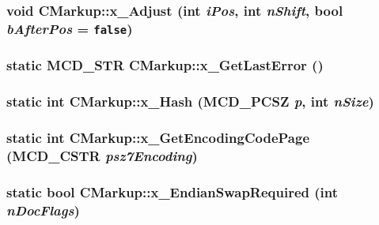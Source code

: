 \subsubsection[x\_\-Adjust]{\setlength{\rightskip}{0pt plus 5cm}void CMarkup::x\_\-Adjust (int {\em iPos}, \/  int {\em nShift}, \/  bool {\em bAfterPos} = {\tt false})\hspace{0.3cm}{\tt  [protected]}}\label{classCMarkup_b9d78278bfb6a7d3799e0289744da98d}


\subsubsection[x\_\-GetLastError]{\setlength{\rightskip}{0pt plus 5cm}static MCD\_\-STR CMarkup::x\_\-GetLastError ()\hspace{0.3cm}{\tt  [static, protected]}}\label{classCMarkup_7a902073dcce3edc449753cb5e8bac4c}


\subsubsection[x\_\-Hash]{\setlength{\rightskip}{0pt plus 5cm}static int CMarkup::x\_\-Hash (MCD\_\-PCSZ {\em p}, \/  int {\em nSize})\hspace{0.3cm}{\tt  [inline, static, protected]}}\label{classCMarkup_e0869e4876675e0272ab21aa4d5c1058}


\subsubsection[x\_\-GetEncodingCodePage]{\setlength{\rightskip}{0pt plus 5cm}static int CMarkup::x\_\-GetEncodingCodePage ({\bf MCD\_\-CSTR} {\em psz7Encoding})\hspace{0.3cm}{\tt  [static, protected]}}\label{classCMarkup_de551e17e600f8e6ec17bf7a46325285}


\subsubsection[x\_\-EndianSwapRequired]{\setlength{\rightskip}{0pt plus 5cm}static bool CMarkup::x\_\-EndianSwapRequired (int {\em nDocFlags})\hspace{0.3cm}{\tt  [static, protected]}}\label{classCMarkup_bf802e6db6a9a527e0d01d5e69a2464a}


